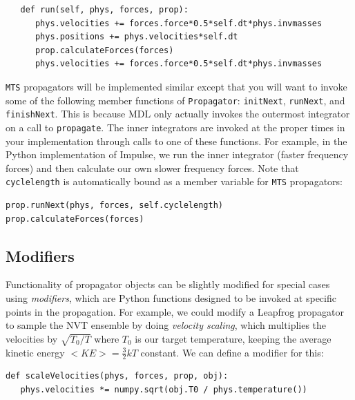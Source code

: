 \documentclass[11pt]{report}
\begin{document}
\begin{verbatim}
   def run(self, phys, forces, prop):
      phys.velocities += forces.force*0.5*self.dt*phys.invmasses
      phys.positions += phys.velocities*self.dt
      prop.calculateForces(forces)
      phys.velocities += forces.force*0.5*self.dt*phys.invmasses
\end{verbatim}

\texttt{MTS} propagators will be implemented similar except that you will
want to invoke some of the following member functions of \texttt{Propagator}:
\texttt{initNext}, \texttt{runNext}, and \texttt{finishNext}.
This is because MDL only actually invokes the outermost integrator on a call
to \texttt{propagate}.  The inner integrators are invoked at the proper
times in your implementation through calls to one of these functions.
For example, in the Python implementation of Impulse, we run the
inner integrator (faster frequency forces) and then calculate our own
slower frequency forces.  Note that \texttt{cyclelength} is automatically
bound as a member variable for \texttt{MTS} propagators:

\begin{verbatim}
prop.runNext(phys, forces, self.cyclelength)
prop.calculateForces(forces)
\end{verbatim}

\subsection{Modifiers}

Functionality of propagator objects can be slightly modified for
special cases using {\it modifiers}, which are Python functions
designed to be invoked at specific points in the propagation.
For example, we could modify a Leapfrog propagator to sample the NVT
ensemble by doing {\it velocity scaling}, which multiplies the 
velocities by \begin{math}\sqrt{T_0/T}\end{math} where 
\begin{math}T_0\end{math} is our target temperature, keeping
the average kinetic energy 
\begin{math} <KE> = \frac{3}{2}kT \end{math} constant.  We can define
a modifier for this:

\begin{verbatim}
def scaleVelocities(phys, forces, prop, obj):
   phys.velocities *= numpy.sqrt(obj.T0 / phys.temperature())
\end{verbatim}
\end{document}
